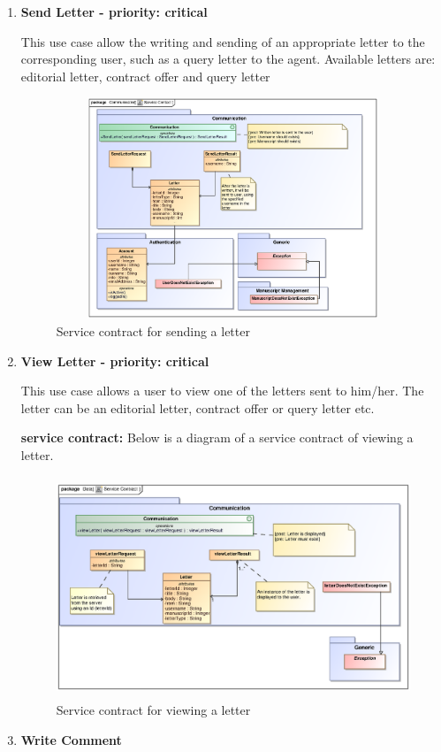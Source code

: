 \documentclass[12pt]{article}
\begin{document}
\begin{enumerate}
\item \textbf{Send Letter - priority: critical}
\par{This use case allow the writing and sending of an appropriate letter to the corresponding user, such as a query letter to the agent. Available letters are: editorial letter, contract offer and query letter}

\begin{figure}[h]
\includegraphics[height=250px, width=500px]{epsImages/Communication/sendLetterServiceContract.eps}
\caption{Service contract for sending a letter}
\end{figure}

\item \textbf{View Letter - priority: critical}\\
\par{This use case allows a user to view one of the letters sent to him/her. The letter can be an editorial letter, contract offer or query letter etc.}

\textbf{service contract:} Below is a diagram of a service contract of viewing a letter.

\begin{figure}[h]
\includegraphics[height=250px, width=500px]{epsImages/Communication/viewLetterServiceContract.eps}
\caption{Service contract for viewing a letter}
\end{figure}
\newpage

\item \textbf{Write Comment}

\end{enumerate}
\end{document}
